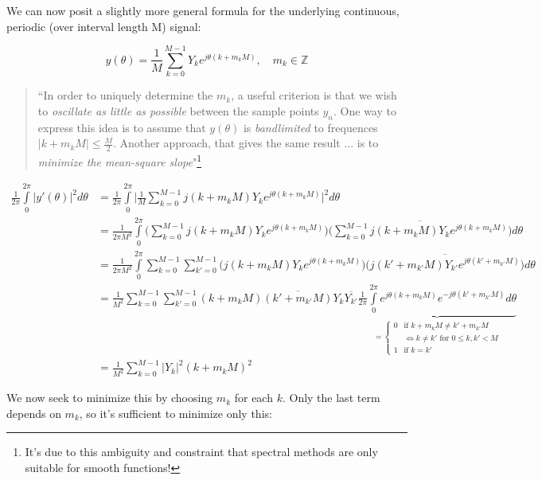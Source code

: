 \documentclass[10pt]{article}
\begin{document}
We can now posit a slightly more general formula for the underlying continuous, periodic (over interval length M) signal:\vspace{-2mm}

$$ y(\theta) = \frac{1}{M} \sum_{k=0}^{M-1} Y_k e^{j \theta (k + m_k M)}, \quad m_k \in \mathbb{Z} $$

\begin{quotation}
``In order to uniquely determine the $m_k$, a useful criterion is that we wish to \textit{oscillate as little as possible} between the sample points $y_n$. One way to express this idea is to assume that $y(\theta)$ is \textit{bandlimited} to frequences $|k + m_k M| \leq \frac{M}{2}$. Another approach, that gives the same result ... is to \textit{minimize the mean-square slope}"\footnote{It's due to this ambiguity and constraint that spectral methods are only suitable for smooth functions!}
\end{quotation}\vspace{-7mm}

\begin{align*}
\frac{1}{2\pi} \int\limits_{0}^{2\pi} |y'(\theta)|^2 d\theta &= \frac{1}{2\pi} \int\limits_{0}^{2\pi} \Big|\frac{1}{M} \sum_{k=0}^{M-1} j(k + m_k M) Y_k e^{j \theta (k + m_k M)} \Big|^2 d\theta \\
&= \frac{1}{2\pi M^2} \int\limits_{0}^{2\pi} \Big( \sum_{k=0}^{M-1} j(k + m_k M) Y_k e^{j \theta (k + m_k M)} \Big) \overline{\Big( \sum_{k=0}^{M-1} j(k + m_k M) Y_k e^{j \theta (k + m_k M)} \Big)} d\theta \\
&= \frac{1}{2\pi M^2} \int\limits_{0}^{2\pi} \sum_{k=0}^{M-1} \sum_{k'=0}^{M-1} \Big( j(k + m_k M) Y_k e^{j \theta (k + m_k M)} \Big) \overline{\Big( j(k' + m_{k'} M) Y_{k'} e^{j \theta (k' + m_{k'} M)} \Big)} d\theta \\
&= \frac{1}{M^2} \sum_{k=0}^{M-1} \sum_{k'=0}^{M-1} (k + m_k M) \overline{(k' + m_{k'} M)} Y_k \overline{Y_{k'}} \underbrace{\frac{1}{2\pi} \int\limits_{0}^{2\pi} e^{j \theta (k + m_k M)} e^{-j \theta (k' + m_{k'} M)} d\theta}_{= \begin{cases} 0 & \text{if } k + m_k M \neq k' + m_{k'} M \\ & \iff k \neq k' \text{ for } 0 \leq k, k' < M \\ 1 & \text{if } k = k'\end{cases}} \\
&= \frac{1}{M^2} \sum_{k=0}^{M-1} |Y_k|^2 (k + m_k M)^2
\end{align*}

We now seek to minimize this by choosing $m_k$ for each $k$. Only the last term depends on $m_k$, so it's sufficient to minimize only this:\vspace{-5mm}
\end{document}
